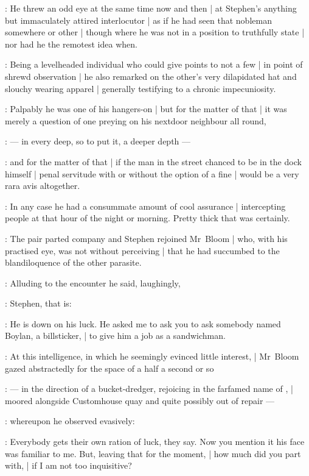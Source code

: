 :
He threw an odd eye at the same time now and then |
at Stephen's anything but immaculately attired interlocutor |
as if he had seen that nobleman somewhere or other |
though where he was not in a position to truthfully state |
nor had he the remotest idea when.

:
Being a levelheaded individual who could give points to not a few |
in point of shrewd observation |
he also remarked
on the other's very dilapidated hat and slouchy wearing apparel |
generally testifying to a chronic impecuniosity.

:
Palpably he was one of his hangers-on |
but for the matter of that |
it was merely a question of one preying on his nextdoor neighbour all round,

:
    --- in every deep, so to put it, a deeper depth ---

:
and for the matter of that |
if the man in the street chanced to be in the dock himself |
penal servitude with or without the option of a fine |
would be a very rara avis altogether.

:
In any case he had a consummate amount of cool assurance |
intercepting people at that hour of the night or morning.
Pretty thick that was certainly.

:
The pair parted company and Stephen rejoined Mr~Bloom |
who, with his practised eye, was not without perceiving |
that he had succumbed to the blandiloquence of the other parasite.

:
Alluding to the encounter he said, laughingly,

:
Stephen, that is:

\Stephen:
He is down on his luck.
He asked me to ask you to ask somebody named Boylan, a billsticker, |
to give him a job as a sandwichman.

:
At this intelligence, in which he seemingly evinced little interest, |
Mr~Bloom gazed abstractedly for the space of a half a second or so

:
    --- in the direction of a bucket-dredger, rejoicing in the farfamed name of , |
        moored alongside Customhouse quay and quite possibly out of repair ---

:
whereupon he observed evasively:

\Bloom:
Everybody gets their own ration of luck, they say.
Now you mention it his face was familiar to me.
But, leaving that for the moment, |
how much did you part with, |
if I am not too inquisitive?

